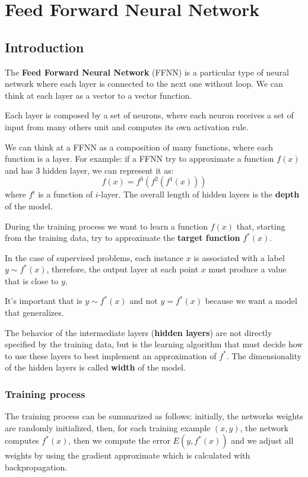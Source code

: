 \chapter{Feed Forward Neural Network}
\section{Introduction}
The \textbf{Feed Forward Neural Network} (FFNN) is a particular type of neural
network where each layer is connected to the next one without loop. We can think
at each layer as a vector to a vector function.

Each layer is composed by a set of neurons, where each neuron receives a set of input
from many others unit and computes its own activation rule.

We can think at a FFNN as a composition of many functions, where each function is
a layer. For example: if a FFNN try to approximate a function $f(x)$ and has $3$
hidden layer, we can represent it as:
\begin{equation*}
    f(x) = f^3(f^2(f^1(x)))
\end{equation*}
where $f^i$ is a function of $i$-layer. The overall length of hidden layers is
the \textbf{depth} of the model.

During the training process we want to learn a function $f(x)$ that, starting from
the training data, try to approximate the \textbf{target function} $f^*(x)$.

In the case of supervised problems, each instance $x$ is associated with a label
$y\sim f^*(x)$, therefore, the output layer at each point $x$ must produce a value
that is close to $y$.
\begin{note}
    It's important that is $y \sim f^*(x)$ and not $y=f^*(x)$ because we want a
    model that generalizes.
\end{note}

The behavior of the intermediate layers (\textbf{hidden layers}) are not directly
specified by the training data, but is the learning algorithm that must decide
how to use these layers to best implement an approximation of $f^*$. The dimensionality
of the hidden layers is called \textbf{width} of the model.

\subsection{Training process}
The training process can be summarized as follows: initially, the networks weights
are randomly initialized, then, for each training example $(x, y)$, the network
computes $f^*(x)$, then we compute the error $E(y, f^*(x))$ and we adjust all weights
by using the gradient approximate which is calculated with backpropagation.

